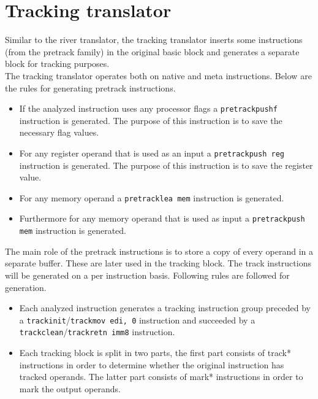 \documentclass[12pt]{report}
\begin{document}
\section{Tracking translator}
\label{sec:tracking-translator}
Similar to the river translator, the tracking translator inserts some instructions (from the pretrack family) in the original basic block and generates a separate block for tracking purposes.\\
\newline
The tracking translator operates both on native and meta instructions. Below are the rules for generating pretrack instructions.\\
\begin{itemize}
	\item If the analyzed instruction uses any processor flags a \texttt{pretrackpushf} instruction is generated. The purpose of this instruction is to save the necessary flag values.
	\item For any register operand that is used as an input a \texttt{pretrackpush reg} instruction is generated. The purpose of this instruction is to save the register value.
	\item For any memory operand a \texttt{pretracklea mem} instruction is generated.
	\item Furthermore for any memory operand that is used as input a \texttt{pretrackpush mem} instruction is generated.
\end{itemize}

The main role of the pretrack instructions is to store a copy of every operand in a separate buffer. These are later used in the tracking block. The track instructions will be generated on a per instruction basis. Following rules are followed for generation.\\
\begin{itemize}
	\item Each analyzed instruction generates a tracking instruction group preceded by a \texttt{trackinit}/\texttt{trackmov edi, 0} instruction and succeeded by a \texttt{trackclean}/\texttt{trackretn imm8} instruction.
	\item Each tracking block is split in two parts, the first part consists of track* instructions in order to determine whether the original instruction has tracked operands. The latter part consists of mark* instructions in order to mark the output operands.
\end{itemize}
\end{document}
